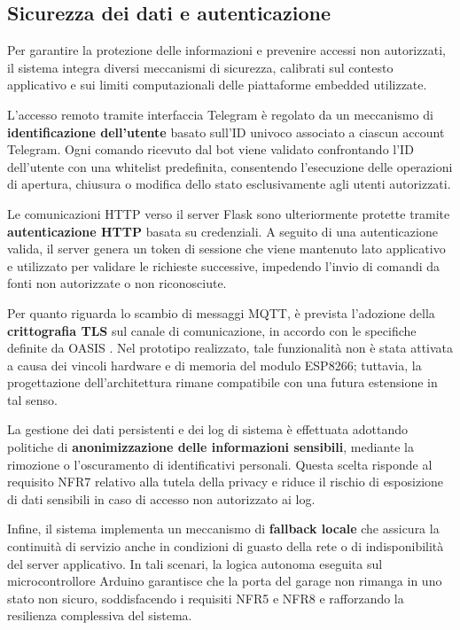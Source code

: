 \subsection*{Sicurezza dei dati e autenticazione}

Per garantire la protezione delle informazioni e prevenire accessi non
autorizzati, il sistema integra diversi meccanismi di sicurezza, calibrati sul
contesto applicativo e sui limiti computazionali delle piattaforme embedded
utilizzate.

L’accesso remoto tramite interfaccia Telegram è regolato da un meccanismo di
\textbf{identificazione dell’utente} basato sull’ID univoco associato a ciascun
account Telegram. Ogni comando ricevuto dal bot viene validato confrontando
l’ID dell’utente con una whitelist predefinita, consentendo l’esecuzione delle
operazioni di apertura, chiusura o modifica dello stato esclusivamente agli
utenti autorizzati.

Le comunicazioni HTTP verso il server Flask sono ulteriormente protette tramite
\textbf{autenticazione HTTP} basata su credenziali. A seguito di una
autenticazione valida, il server genera un token di sessione che viene
mantenuto lato applicativo e utilizzato per validare le richieste successive,
impedendo l’invio di comandi da fonti non autorizzate o non riconosciute.

Per quanto riguarda lo scambio di messaggi MQTT, è prevista l’adozione della
\textbf{crittografia TLS} sul canale di comunicazione, in accordo con le
specifiche definite da OASIS \cite{MQTTspec}. Nel prototipo realizzato, tale
funzionalità non è stata attivata a causa dei vincoli hardware e di memoria del
modulo ESP8266; tuttavia, la progettazione dell’architettura rimane compatibile
con una futura estensione in tal senso.

La gestione dei dati persistenti e dei log di sistema è effettuata adottando
politiche di \textbf{anonimizzazione delle informazioni sensibili}, mediante la
rimozione o l’oscuramento di identificativi personali. Questa scelta risponde al
requisito NFR7 relativo alla tutela della privacy e riduce il rischio di
esposizione di dati sensibili in caso di accesso non autorizzato ai log.

Infine, il sistema implementa un meccanismo di \textbf{fallback locale} che
assicura la continuità di servizio anche in condizioni di guasto della rete o
di indisponibilità del server applicativo. In tali scenari, la logica autonoma
eseguita sul microcontrollore Arduino garantisce che la porta del garage non
rimanga in uno stato non sicuro, soddisfacendo i requisiti NFR5 e NFR8 e
rafforzando la resilienza complessiva del sistema.



